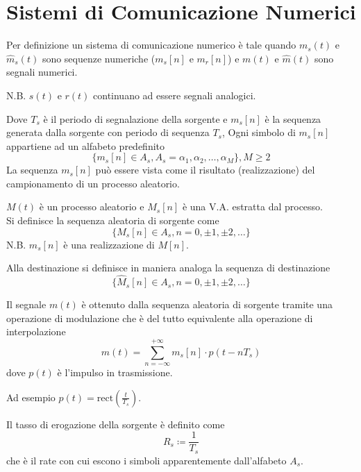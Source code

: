 
\section*{Sistemi di Comunicazione Numerici}
Per definizione un sistema di comunicazione numerico è tale quando \( m_s(t) \) e \( \hat{m}_s(t)\) sono sequenze numeriche (\( m_s[n] \) e \( m_r[n] \)) e \( m(t) \) e \( \hat{m}(t) \) sono segnali numerici.

N.B. \( s(t) \) e \( r(t) \) continuano ad essere segnali analogici.

\begin{center}
\end{center}
Dove
\( T_s \) è il periodo di segnalazione della sorgente e
\( m_s[n] \) è la sequenza generata dalla sorgente con periodo di sequenza \( T_s \),
Ogni simbolo di \( m_s[n] \) appartiene ad un alfabeto predefinito
\[\{ m_s[n] \in A_s ,  A_s = \alpha_1, \alpha_2, \ldots, \alpha_M\},  M \geq 2  \]La sequenza \( m_s[n] \) può essere vista come il risultato (realizzazione) del campionamento di un processo aleatorio.



\( M(t) \) è un processo aleatorio e \( M_s[n] \) è una V.A. estratta dal processo. \\
Si definisce la sequenza aleatoria di sorgente come
\[ \{ M_s[n] \in A_s, n = 0, \pm 1, \pm 2, \ldots \} \]
N.B. \( m_s[n] \) è una realizzazione di \( M[n] \).

Alla destinazione si definisce in maniera analoga la sequenza di destinazione
\[ \{ \hat{M}_s[n] \in A_s, n = 0, \pm 1, \pm 2, \ldots \} \]

Il segnale \( m(t) \) è ottenuto dalla sequenza aleatoria di sorgente tramite una operazione di modulazione che è del tutto equivalente alla operazione di interpolazione
\[ m(t) = \sum_{n=-\infty}^{+\infty} m_s[n]\cdot p(t - nT_s) \]
dove \( p(t) \) è l'impulso in trasmissione.

Ad esempio \( p(t) = \text{rect}\left(\frac{t}{T_s}\right) \).

Il tasso di erogazione della sorgente è definito come
\[ R_s \coloneqq \frac{1}{T_s} \]
che è il rate con cui escono i simboli apparentemente dall'alfabeto \( A_s \).

